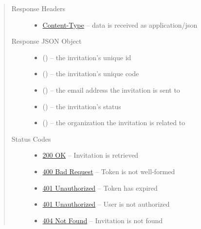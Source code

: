 \documentclass[letterpaper,10pt,english]{sphinxmanual}
\begin{document}
\begin{fulllineitems}
\begin{quote}
\begin{description}
\item[{Response Headers}] \leavevmode\begin{itemize}
\item {} 
\href{http://tools.ietf.org/html/rfc7231\#section-3.1.1.5}{Content-Type} -- data is received as application/json

\end{itemize}

\item[{Response JSON Object}] \leavevmode\begin{itemize}
\item {} 
 () -- the invitation's unique id

\item {} 
 () -- the invitation's unique code

\item {} 
 () -- the email address the invitation is sent to

\item {} 
 () -- the invitation's status

\item {} 
 () -- the organization the invitation is related
to

\end{itemize}

\item[{Status Codes}] \leavevmode\begin{itemize}
\item {} 
\href{http://www.w3.org/Protocols/rfc2616/rfc2616-sec10.html\#sec10.2.1}{200 OK} -- Invitation is retrieved

\item {} 
\href{http://www.w3.org/Protocols/rfc2616/rfc2616-sec10.html\#sec10.4.1}{400 Bad Request} -- Token is not well-formed

\item {} 
\href{http://www.w3.org/Protocols/rfc2616/rfc2616-sec10.html\#sec10.4.2}{401 Unauthorized} -- Token has expired

\item {} 
\href{http://www.w3.org/Protocols/rfc2616/rfc2616-sec10.html\#sec10.4.2}{401 Unauthorized} -- User is not authorized

\item {} 
\href{http://www.w3.org/Protocols/rfc2616/rfc2616-sec10.html\#sec10.4.5}{404 Not Found} -- Invitation is not found

\end{itemize}

\end{description}\end{quote}

\end{fulllineitems}
\end{document}
